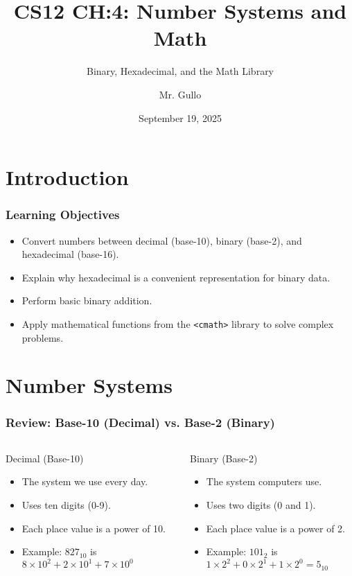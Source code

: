 \documentclass{beamer}
\title[Number Systems and Math]{CS12 CH:4: Number Systems and Math}
\subtitle{Binary, Hexadecimal, and the Math Library}
\author[Mr. Gullo]{Mr. Gullo}
\date[Sep 19, 2025]{September 19, 2025}
\begin{document}
\frame{\titlepage}

\section{Introduction}

\begin{frame}
\frametitle{Learning Objectives}
\begin{itemize}
    \item Convert numbers between decimal (base-10), binary (base-2), and hexadecimal (base-16).
    \item Explain why hexadecimal is a convenient representation for binary data.
    \item Perform basic binary addition.
    \item Apply mathematical functions from the \texttt{<cmath>} library to solve complex problems.
\end{itemize}
\end{frame}

\section{Number Systems}

\begin{frame}
\frametitle{Review: Base-10 (Decimal) vs. Base-2 (Binary)}
\begin{columns}[T]
    \begin{column}{0.5\textwidth}
        \begin{block}{Decimal (Base-10)}
            \begin{itemize}
                \item The system we use every day.
                \item Uses ten digits (0-9).
                \item Each place value is a power of 10.
                \item Example: $827_{10}$ is\\ $8 \times 10^2 + 2 \times 10^1 + 7 \times 10^0$
            \end{itemize}
        \end{block}
    \end{column}
    \begin{column}{0.5\textwidth}
        \begin{block}{Binary (Base-2)}
            \begin{itemize}
                \item The system computers use.
                \item Uses two digits (0 and 1).
                \item Each place value is a power of 2.
                \item Example: $101_2$ is\\ $1 \times 2^2 + 0 \times 2^1 + 1 \times 2^0 = 5_{10}$
            \end{itemize}
        \end{block}
    \end{column}
\end{columns}
\end{frame}
\end{document}
